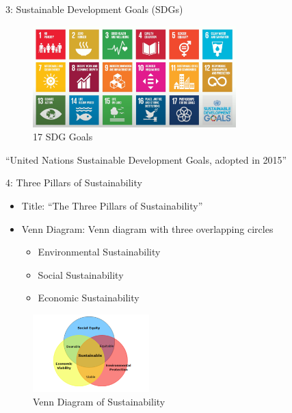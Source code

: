 \documentclass[
  ignorenonframetext,
]{beamer}
\providecommand{\tightlist}{%
  \setlength{\itemsep}{0pt}\setlength{\parskip}{0pt}}\usepackage{longtable,booktabs,array}
\begin{document}
\begin{frame}{3: Sustainable Development Goals (SDGs)}
\label{sustainable-development-goals-sdgs}
\begin{figure}[H]

{\centering \includegraphics[width=0.7\textwidth,height=\textheight]{asset/SDGs17.png}

}

\caption{17 SDG Goals}

\end{figure}%

``United Nations Sustainable Development Goals, adopted in 2015''
\end{frame}

\begin{frame}{4: Three Pillars of Sustainability}
\label{three-pillars-of-sustainability}
\begin{itemize}
\tightlist
\item
  Title: ``The Three Pillars of Sustainability''
\item
  Venn Diagram: Venn diagram with three overlapping circles

  \begin{itemize}
  \tightlist
  \item
    Environmental Sustainability
  \item
    Social Sustainability
  \item
    Economic Sustainability
  \end{itemize}
\end{itemize}

\begin{figure}[H]

{\centering \includegraphics[width=0.4\textwidth,height=\textheight]{L2_files/mediabag/444c0baa-7e22-4182-9.png}

}

\caption{Venn Diagram of Sustainability}

\end{figure}%
\end{frame}
\end{document}
